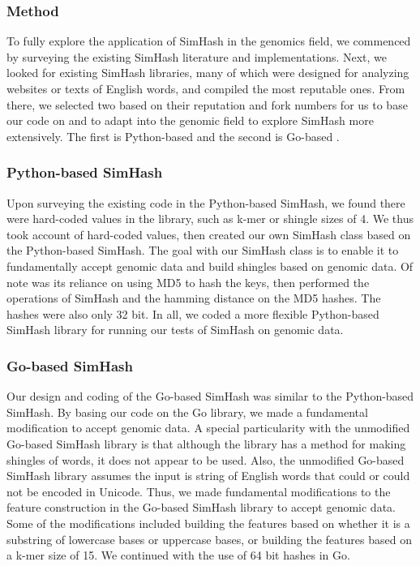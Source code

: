 \documentclass[12pt, letterpaper]{article}
\begin{document}
\subsubsection{Method}
To fully explore the application of SimHash in the genomics field, we commenced by surveying the existing SimHash literature and implementations. Next, we looked for existing SimHash libraries, many of which were designed for analyzing websites or texts of English words, and compiled the most reputable ones. From there, we selected two based on their reputation and fork numbers for us to base our code on and to adapt into the genomic field to explore SimHash more extensively. The first is Python-based \cite{python-simhash} and the second is Go-based \cite{go-simhash}.

\subsubsection{Python-based SimHash}
Upon surveying the existing code in the Python-based SimHash, we found there were hard-coded values in the library, such as k-mer or shingle sizes of 4. We thus took account of hard-coded values, then created our own SimHash class based on the Python-based SimHash. The goal with our SimHash class is to enable it to fundamentally accept genomic data and build shingles based on genomic data. Of note was its reliance on using MD5 to hash the keys, then performed the operations of SimHash and the hamming distance on the MD5 hashes. The hashes were also only 32 bit. In all, we coded a more flexible Python-based SimHash library for running our tests of SimHash on genomic data.

\subsubsection{Go-based SimHash}
Our design and coding of the Go-based SimHash was similar to the Python-based SimHash. By basing our code on the Go library, we made a fundamental modification to accept genomic data. A special particularity with the unmodified Go-based SimHash library is that although the library has a method for making shingles of words, it does not appear to be used. Also, the unmodified Go-based SimHash library assumes the input is string of English words that could or could not be encoded in Unicode. Thus, we made fundamental modifications to the feature construction in the Go-based SimHash library to accept genomic data. Some of the modifications included building the features based on whether it is a substring of lowercase bases or uppercase bases, or building the features based on a k-mer size of 15. We continued with the use of 64 bit hashes in Go.
\end{document}

